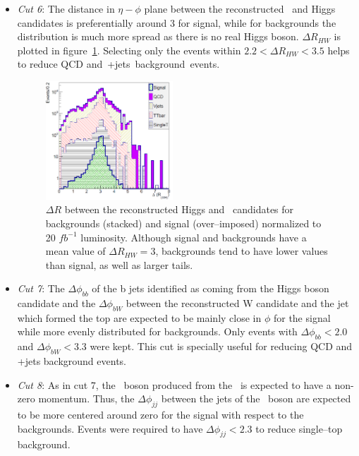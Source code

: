 \begin{itemize}
\item \textit{Cut 6}: The distance in $\eta-\phi$ plane between the reconstructed \W~and Higgs candidates is preferentially around 3 for signal, while for backgrounds the distribution is much more spread as there is no real Higgs boson. $\Delta R_{HW}$ is plotted in figure~\ref{fig:Var3}. Selecting only the events within $2.2<\Delta R_{HW}<3.5$ helps to reduce QCD and~\W+jets~background~events.

\begin{figure}[!Hhtbp]
  \begin{center}
    \includegraphics[width=0.45\textwidth]{figs/Pheno/DRWH.png}
    \caption{$\Delta R$ between the reconstructed Higgs and \W~candidates for backgrounds (stacked) and signal (over--imposed) normalized to 20 $fb^{-1}$ luminosity. Although signal and backgrounds have a mean value of $\Delta R_{HW}=3$, backgrounds tend to have lower values than signal, as well as larger tails.}
    \label{fig:Var3}
  \end{center}
\end{figure}

\item \textit{Cut 7}: The $\Delta \phi_{bb}$ of the b jets identified as coming from the Higgs boson candidate and the $\Delta \phi_{bW}$ between the reconstructed W candidate and the jet which formed the top are expected to be mainly close in $\phi$ for the signal while more evenly distributed for backgrounds. Only events with $\Delta \phi_{bb}<2.0$ and $\Delta \phi_{bW}<3.3$ were kept. This cut is specially useful for reducing QCD and \W+jets background events.

\item \textit{Cut 8}: As in cut 7, the \W~boson produced from the \Tp~is expected to have a non-zero momentum. Thus, the $\Delta \phi_{jj}$ between the jets of the \W~boson are expected to be more centered around zero for the signal with respect to the backgrounds. Events were required to have $\Delta \phi_{jj}<2.3$ to reduce single--top background.


\end{itemize}
